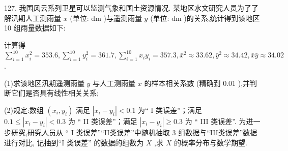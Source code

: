 \begin{center}
\end{center}

127. 我国风云系列卫星可以监测气象和国土资源情况. 某地区水文研究人员为了了解汛期人工测雨量 $x$ (单位: $\mathrm{{dm}}$ )与遥测雨量 $y$ (单位: $\mathrm{{dm}}$ )的关系,统计得到该地区 10 组雨量数据如下:

\begin{center}
\end{center}

计算得 $\mathop{\sum }\limits_{{i = 1}}^{{10}}{x}_{i}^{2} = {353.6},\mathop{\sum }\limits_{{i = 1}}^{{10}}{y}_{i}^{2} = {361.7},\mathop{\sum }\limits_{{i = 1}}^{{10}}{x}_{i}{y}_{i} = {357.3},{\bar{x}}^{2} \approx  {33.62},{\bar{y}}^{2} \approx  {34.42},\bar{x}\bar{y} \approx  {34.02}$ .

(1)求该地区汛期遥测雨量 $y$ 与人工测雨量 $x$ 的样本相关系数 (精确到 0.01 ),并判断它们是否具有线性相关关系;

(2)规定:数组 $\left( {{x}_{i},{y}_{i}}\right)$ 满足 $\left| {{x}_{i} - {y}_{i}}\right|  < {0.1}$ 为“ $\mathrm{I}$ 类误差”；满足 ${0.1} \leq  \left| {{x}_{i} - {y}_{i}}\right|  < {0.3}$ 为 “ II 类误差”；满足 $\left| {{x}_{i} - {y}_{i}}\right|  \geq  {0.3}$ 为 “ III 类误差”. 为进一步研究,研究人员从 “ I 类误差”“II类误差”中随机抽取 3 组数据与“III类误差”数据进行对比, 记抽到“I 类误差” 的数据的组数为 $X$ ,求 $X$ 的概率分布与数学期望.

